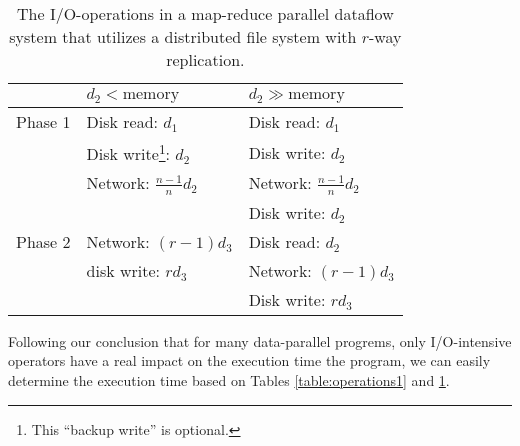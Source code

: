 \documentclass{acm_proc_article-sp}
\begin{document}
\begin{table}
\centering
\begin{minipage}{0.5\textwidth}
\centering
\renewcommand{\arraystretch}{1.2}
\begin{tabular}{|l|l|l|}
\hline
        & $d_2 < \text{memory}$           & $d_2 \gg \text{memory}$ \\ \hline
Phase 1 & Disk read: $d_1$                & Disk read: $d_1$ \\ 
        & Disk write\footnote{This ``backup write'' is optional.}: $d_2$ & Disk write: $d_2$ \\
        & Network: $\frac{n-1}{n} d_2$    & Network: $\frac{n-1}{n} d_2$ \\
        &                                 & Disk write: $d_2$ \\ \hline
Phase 2 & Network: $\left(r-1\right) d_3$ & Disk read: $d_2$ \\
        & disk write: $r d_3$             & Network: $\left(r-1\right) d_3$ \\
        &                                 & Disk write: $r d_3$ \\
        \hline
\end{tabular}
\caption{The I/O-operations in a map-reduce parallel dataflow system that utilizes a distributed file system with $r$-way replication.}
\label{table:operations2}
\end{minipage}
\end{table}

Following our conclusion that for many data-parallel progrems, only
I/O-intensive operators have a real impact on the execution time the program,
we can easily determine the execution time based on Tables
\ref{table:operations1} and \ref{table:operations2}.
\end{document}
